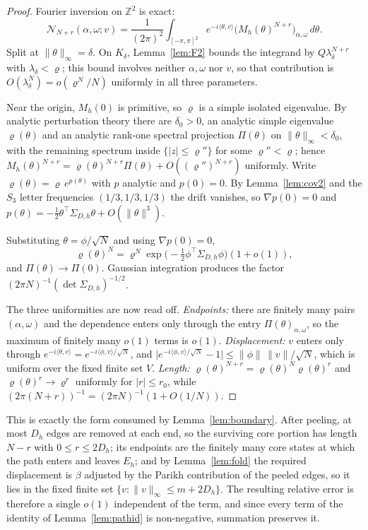 \begin{proof}
Fourier inversion on \(\mathbb Z^2\) is exact:
\[
\mathcal N_{N+r}(\alpha,\omega;v)=\frac1{(2\pi)^2}
\int_{[-\pi,\pi]^2}e^{-i\langle\theta,v\rangle}
\bigl(M_h(\theta)^{N+r}\bigr)_{\alpha,\omega}\,d\theta .
\]
Split at \(\|\theta\|_\infty=\delta\). On \(K_\delta\), Lemma~\ref{lem:F2}
bounds the integrand by \(Q\lambda_\delta^{N+r}\) with
\(\lambda_\delta<\varrho\); this bound involves neither \(\alpha,\omega\) nor
\(v\), so that contribution is \(O(\lambda_\delta^{N})=o(\varrho^{N}/N)\)
uniformly in all three parameters.

Near the origin, \(M_h(0)\) is primitive, so \(\varrho\) is a simple isolated
eigenvalue. By analytic perturbation theory there are \(\delta_0>0\), an
analytic simple eigenvalue \(\varrho(\theta)\) and an analytic rank-one
spectral projection \(\Pi(\theta)\) on \(\|\theta\|_\infty<\delta_0\), with the
remaining spectrum inside \(\{|z|\le\varrho''\}\) for some
\(\varrho''<\varrho\); hence
\(M_h(\theta)^{N+r}=\varrho(\theta)^{N+r}\Pi(\theta)+O((\varrho'')^{N+r})\)
uniformly. Write \(\varrho(\theta)=\varrho\,e^{p(\theta)}\) with \(p\)
analytic and \(p(0)=0\). By Lemma~\ref{lem:cov2} and the \(S_3\) letter
frequencies \((1/3,1/3,1/3)\) the drift vanishes, so \(\nabla p(0)=0\) and
\(p(\theta)=-\tfrac12\theta^{\!\top}\Sigma_{D,h}\theta+O(\|\theta\|^3)\).

Substituting \(\theta=\phi/\sqrt N\) and using \(\nabla p(0)=0\),
\[
\varrho(\theta)^{N}=\varrho^{N}
\exp\bigl(-\tfrac12\phi^{\!\top}\Sigma_{D,h}\phi\bigr)(1+o(1)),
\]
and \(\Pi(\theta)\to\Pi(0)\). Gaussian integration produces the factor
\((2\pi N)^{-1}(\det\Sigma_{D,h})^{-1/2}\).

The three uniformities are now read off. \emph{Endpoints:} there are finitely
many pairs \((\alpha,\omega)\) and the dependence enters only through the entry
\(\Pi(\theta)_{\alpha,\omega}\), so the maximum of finitely many \(o(1)\)
terms is \(o(1)\). \emph{Displacement:} \(v\) enters only through
\(e^{-i\langle\theta,v\rangle}=e^{-i\langle\phi,v\rangle/\sqrt N}\), and
\(\bigl|e^{-i\langle\phi,v\rangle/\sqrt N}-1\bigr|\le\|\phi\|\,\|v\|/\sqrt N\),
which is uniform over the fixed finite set \(V\). \emph{Length:}
\(\varrho(\theta)^{N+r}=\varrho(\theta)^{N}\varrho(\theta)^{r}\) and
\(\varrho(\theta)^{r}\to\varrho^{r}\) uniformly for \(|r|\le r_0\), while
\((2\pi(N+r))^{-1}=(2\pi N)^{-1}(1+O(1/N))\).
\end{proof}

\begin{remark}
This is exactly the form consumed by Lemma~\ref{lem:boundary}. After peeling,
at most \(D_h\) edges are removed at each end, so the surviving core portion
has length \(N-r\) with \(0\le r\le 2D_h\); its endpoints are the finitely many
core states at which the path enters and leaves \(E_h\); and by
Lemma~\ref{lem:fold} the required displacement is \(\beta\) adjusted by the
Parikh contribution of the peeled edges, so it lies in the fixed finite set
\(\{v:\|v\|_\infty\le m+2D_h\}\). The resulting relative error is therefore a
single \(o(1)\) independent of the term, and since every term of the identity
of Lemma~\ref{lem:pathid} is non-negative, summation preserves it.
\end{remark}
